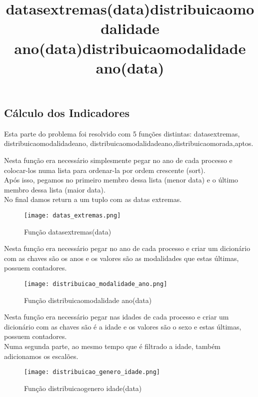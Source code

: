 \documentclass[11pt,a4paper]{report}%
\begin{document}
\subsection{Cálculo dos Indicadores} \label{subsec:indicadoresCalc}
Esta parte do problema foi resolvido com 5 funções distintas: datas\textunderscore extremas, distribuicao\textunderscore modalidade\textunderscore ano, distribuicao\textunderscore modalidade\textunderscore ano,distribuicao\textunderscore morada,aptos.\\

\title{\textbf{datas\textunderscore extremas(data)}}

Nesta função era necessário simplesmente pegar no ano de cada processo e colocar-los numa lista para ordenar-la por ordem crescente (sort).\\
Após isso, pegamos no primeiro membro dessa lista (menor data) e o último membro dessa lista (maior data).\\
No final damos return a um tuplo com as datas extremas.



\begin{figure}[htbp]
\centerline{\texttt{[image: datas\_extremas.png]}}
\caption{Função datas\textunderscore extremas(data)}
\label{fig}
\end{figure}  

\newpage
\title{\textbf{distribuicao\textunderscore modalidade \textunderscore ano(data)}}

Nesta função era necessário pegar no ano de cada processo e criar um dicionário com as chaves são os anos e os valores são as modalidades que estas últimas, possuem contadores.\\

\begin{figure}[htbp]
\centerline{\texttt{[image: distribuicao\_modalidade\_ano.png]}}
\caption{Função distribuicao\textunderscore modalidade \textunderscore ano(data)}
\label{fig}
\end{figure}  

\title{\textbf{distribuicao\textunderscore modalidade \textunderscore ano(data)}}

Nesta função era necessário pegar nas idades de cada processo e criar um dicionário com as chaves são é a idade e os valores são o sexo e estas últimas, possuem contadores.\\
Numa segunda parte, ao mesmo tempo que é filtrado a idade, também adicionamos os escalões.
\begin{figure}[htbp]
\centerline{\texttt{[image: distribuicao\_genero\_idade.png]}}
\caption{Função distribuicao\textunderscore genero \textunderscore idade(data)}
\label{fig}
\end{figure}  
\end{document}
